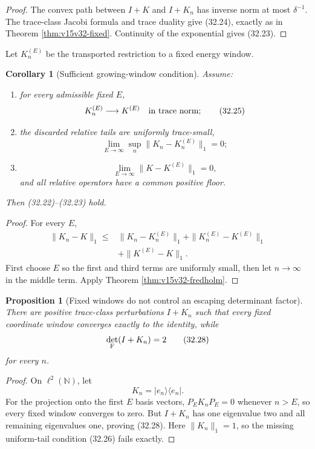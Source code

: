 \documentclass[11pt]{article}
\newtheorem{proposition}[theorem]{Proposition}
\newtheorem{corollary}[theorem]{Corollary}
\theoremstyle{remark}
\begin{document}
\begin{proof}
The convex path between \(I+K\) and \(I+K_n\) has inverse norm at
most \(\delta^{-1}\).  The trace-class Jacobi formula and trace
duality give (32.24), exactly as in Theorem
\ref{thm:v15v32-fixed}.  Continuity of the exponential gives
(32.23).
\end{proof}

Let \(K_n^{(E)}\) be the transported restriction to a fixed energy
window.

\begin{corollary}[Sufficient growing-window condition]
\label{cor:v15v32-growing}
Assume:
\begin{enumerate}
\item for every admissible fixed \(E\),
      \[
       K_n^{(E)}\longrightarrow K^{(E)}
       \quad\hbox{in trace norm};                           \tag{32.25}
      \]
\item the discarded relative tails are uniformly trace-small,
      \[
       \lim_{E\to\infty}\sup_n
       \|K_n-K_n^{(E)}\|_1=0;                               \tag{32.26}
      \]
\item
      \[
       \lim_{E\to\infty}\|K-K^{(E)}\|_1=0,                 \tag{32.27}
      \]
      and all relative operators have a common positive floor.
\end{enumerate}
Then (32.22)--(32.23) hold.
\end{corollary}

\begin{proof}
For every \(E\),
\[
\begin{aligned}
 \|K_n-K\|_1
 \le{}&
 \|K_n-K_n^{(E)}\|_1+
 \|K_n^{(E)}-K^{(E)}\|_1\\
 &+\|K^{(E)}-K\|_1.
\end{aligned}
\]
First choose \(E\) so the first and third terms are uniformly small,
then let \(n\to\infty\) in the middle term.  Apply Theorem
\ref{thm:v15v32-fredholm}.
\end{proof}

\begin{proposition}[Fixed windows do not control an escaping
determinant factor]
\label{prop:v15v32-counterexample}
There are positive trace-class perturbations \(I+K_n\) such that
every fixed coordinate window converges exactly to the identity,
while
\[
 \det_{\rm F}(I+K_n)=2                                     \tag{32.28}
\]
for every \(n\).
\end{proposition}

\begin{proof}
On \(\ell^2(\mathbb N)\), let
\[
 K_n=|e_n\rangle\langle e_n|.
\]
For the projection onto the first \(E\) basis vectors,
\(P_EK_nP_E=0\) whenever \(n>E\), so every fixed window converges
to zero.  But \(I+K_n\) has one eigenvalue two and all remaining
eigenvalues one, proving (32.28).  Here
\(\|K_n\|_1=1\), so the missing uniform-tail condition (32.26)
fails exactly.
\end{proof}
\end{document}
